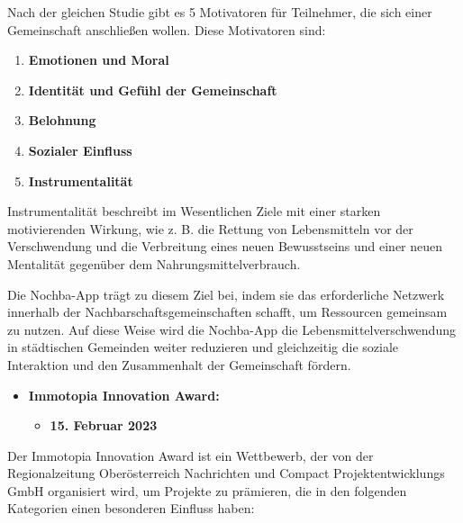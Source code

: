 Nach der gleichen Studie gibt es 5 Motivatoren für Teilnehmer, die sich einer Gemeinschaft anschließen wollen. Diese Motivatoren sind:

\begin{enumerate}
    \item \textbf{Emotionen und Moral}
    \item \textbf{Identität und Gefühl der Gemeinschaft}
    \item \textbf{Belohnung}
    \item \textbf{Sozialer Einfluss}
    \item \textbf{Instrumentalität}
\end{enumerate}

Instrumentalität beschreibt im Wesentlichen Ziele mit einer starken motivierenden Wirkung, wie z. B. die Rettung von Lebensmitteln vor der Verschwendung und die Verbreitung eines neuen Bewusstseins und einer neuen Mentalität gegenüber dem Nahrungsmittelverbrauch.

Die Nochba-App trägt zu diesem Ziel bei, indem sie das erforderliche Netzwerk innerhalb der Nachbarschaftsgemeinschaften schafft, um Ressourcen gemeinsam zu nutzen. Auf diese Weise wird die Nochba-App die Lebensmittelverschwendung in städtischen Gemeinden weiter reduzieren und gleichzeitig die soziale Interaktion und den Zusammenhalt der Gemeinschaft fördern. 


\begin{itemize}
    \item \textbf{Immotopia Innovation Award:}
    \begin{itemize}
        \item \textbf{15. Februar 2023}
    \end{itemize}
\end{itemize}

Der Immotopia Innovation Award ist ein Wettbewerb, der von der Regionalzeitung Oberösterreich Nachrichten und Compact Projektentwicklungs GmbH organisiert wird, um Projekte zu prämieren, die in den folgenden Kategorien einen besonderen Einfluss haben:

